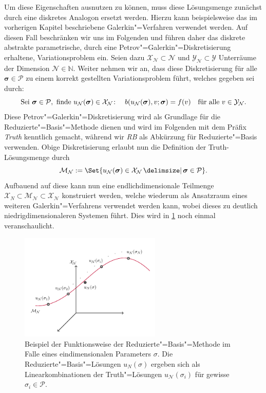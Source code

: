 \documentclass[../main.tex]{subfiles}
\begin{document}
Um diese Eigenschaften ausnutzen zu können, muss diese Lösungsmenge zunächst durch eine diskretes Analogon ersetzt werden.
Hierzu kann beispielsweise das im vorherigen Kapitel beschriebene Galerkin"=Verfahren verwendet werden.
Auf diesen Fall beschränken wir uns im Folgenden und führen daher das diskrete abstrakte parametrische, durch eine Petrov"=Galerkin"=Diskretisierung erhaltene, Variationsproblem ein.
Seien dazu $\mathcal X_{\mathcal N} \subset \mathcal N$ und $\mathcal Y_{\mathcal N} \subset \mathcal Y$ Unterräume der Dimension $\mathcal N \in \mathbb{N}$.
Weiter nehmen wir an, dass diese Diskretisierung für alle $\bm \sigma \in \mathcal P$ zu einem korrekt gestellten Variationsproblem führt, welches gegeben sei durch:
\begin{equation}
\label{eq:diskretes_abstraktes_parametrisches_vp}
    \text{Sei } \bm \sigma \in \mathcal P, \text{ finde } u_{\mathcal N}(\bm \sigma) \in \mathcal X_{\mathcal N} \colon \quad b(u_{\mathcal N}(\bm \sigma), v; \bm \sigma) = f(v) \quad \fa v \in \mathcal Y_{\mathcal N}.
\end{equation}
Diese Petrov"=Galerkin"=Diskretisierung wird als Grundlage für die Reduzierte"=Basis"=Methode dienen und wird im Folgenden mit dem Präfix \emph{Truth} kenntlich gemacht, während wir \emph{RB} als Abkürzung für Reduzierte"=Basis verwenden.
Obige Diskretisierung erlaubt nun die Definition der Truth-Lösungsmenge durch
\begin{equation}
\label{eq:truth_loesungsmenge}
    \mathcal M_{\mathcal N} := \Set{u_{\mathcal N}(\bm \sigma) \in \mathcal X_{\mathcal N} \given \bm \sigma \in \mathcal P}.
\end{equation}
Aufbauend auf diese kann nun eine endlichdimensionale Teilmenge $\mathcal X_{N} \subset \mathcal M_{\mathcal N} \subset \mathcal X_{\mathcal N}$ konstruiert werden, welche wiederum als Ansatzraum eines weiteren Galerkin"=Verfahrens verwendet werden kann,
wobei dieses zu deutlich niedrigdimensionaleren Systemen führt.
Dies wird in \cref{figure:rbm_loesungsmenge} noch einmal veranschaulicht.

\begin{figure}[tb]
    \centering
    \includegraphics[width=0.6\textwidth]{figures/rb.pdf}
    \caption[%
    Skizze zur Motivation der Reduzierte-Basis-Methode.
    ]{
        Beispiel der Funktionsweise der Reduzierte"=Basis"=Methode im Falle eines eindimensionalen Parameters $\sigma$.
        Die Reduzierte"=Basis"=Lösungen $u_{N}(\sigma)$ ergeben sich als Linearkombinationen der Truth"=Lösungen $u_{\mathcal N}(\sigma_{i})$ für gewisse $\sigma_{i} \in \mathcal P$.
        }
    \label{figure:rbm_loesungsmenge}
\end{figure}
\end{document}
